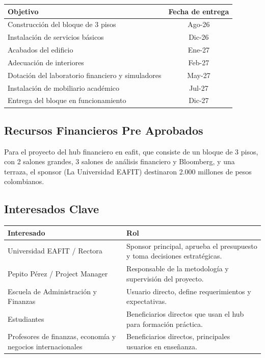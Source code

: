 \begin{tabularx}{\textwidth}{|X|c|}
\hline
\textbf{Objetivo} & \textbf{Fecha de entrega} \\
\hline
Construcción del bloque de 3 pisos & Ago-26 \\
\hline
Instalación de servicios básicos & Dic-26 \\
\hline
Acabados del edificio & Ene-27 \\
\hline
Adecuación de interiores & Feb-27 \\
\hline
Dotación del laboratorio financiero y simuladores & May-27 \\
\hline
Instalación de mobiliario académico & Jul-27 \\
\hline
Entrega del bloque en funcionamiento & Dic-27 \\
\hline
\end{tabularx}

\subsection{Recursos Financieros Pre Aprobados}

Para el proyecto del hub financiero en eafit, que consiste de un bloque de 3 pisos, con 2 salones grandes, 3 salones de análisis financiero y Bloomberg, y una terraza, el sponsor (La Universidad EAFIT) destinaron 2.000 millones de pesos colombianos.

\subsection{Interesados Clave}

\begin{tabularx}{\textwidth}{|X|X|}
\hline
\textbf{Interesado} & \textbf{Rol} \\
\hline
Universidad EAFIT / Rectora & Sponsor principal, aprueba el presupuesto y toma decisiones estratégicas. \\
\hline
Pepito Pérez / Project Manager & Responsable de la metodología y supervisión del proyecto. \\
\hline
Escuela de Administración y Finanzas & Usuario directo, define requerimientos y expectativas. \\
\hline
Estudiantes & Beneficiarios directos que usan el hub para formación práctica. \\
\hline
Profesores de finanzas, economía y negocios internacionales & Beneficiarios directos, principales usuarios en enseñanza. \\
\hline
\end{tabularx}

